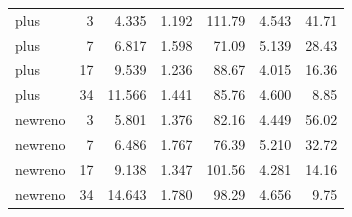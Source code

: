 \documentclass[11pt,a4paper]{article}
\begin{document}
\begin{table}[H]
\begin{tabular}{lrrrrrr}
plus     & 3  & 4.335 & 1.192 & 111.79 & 4.543 & 41.71 \\
plus     & 7  & 6.817 & 1.598 & 71.09 & 5.139 & 28.43 \\
plus     & 17 & 9.539 & 1.236 & 88.67 & 4.015 & 16.36 \\
plus     & 34 & 11.566 & 1.441 & 85.76 & 4.600 & 8.85 \\
newreno  & 3  & 5.801 & 1.376 & 82.16 & 4.449 & 56.02 \\
newreno  & 7  & 6.486 & 1.767 & 76.39 & 5.210 & 32.72 \\
newreno  & 17 & 9.138 & 1.347 & 101.56 & 4.281 & 14.16 \\
newreno  & 34 & 14.643 & 1.780 & 98.29 & 4.656 & 9.75 \\
\bottomrule
\end{tabular}
\end{table}
\end{document}
